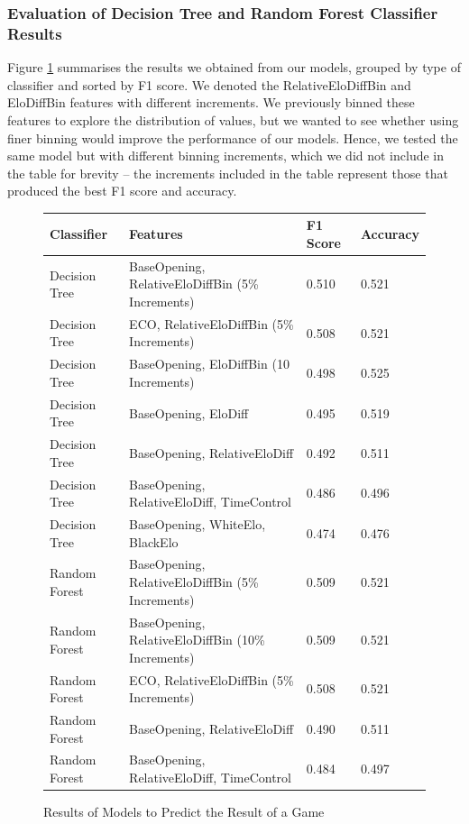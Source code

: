 \documentclass[a4paper, 11pt]{article}
\begin{document}
\subsubsection{Evaluation of Decision Tree and Random Forest Classifier Results}
Figure \ref{fig:resultsOfModelsToPredictResultOfAGame} summarises the results we obtained from our models, grouped by type of classifier and sorted by F1 score. We denoted the RelativeEloDiffBin and EloDiffBin features with different increments. We previously binned these features to explore the distribution of values, but we wanted to see whether using finer binning would improve the performance of our models. Hence, we tested the same model but with different binning increments, which we did not include in the table for brevity -- the increments included in the table represent those that produced the best F1 score and accuracy.

\begin{figure}[H]
    \centering
    \caption{Results of Models to Predict the Result of a Game}
    \label{fig:resultsOfModelsToPredictResultOfAGame}
    \begin{tabular}{| l | l | l | l |} 
        \hline
        \bf{Classifier} & \bf{Features} & \bf{F1 Score} & \bf{Accuracy} \\ [0.5ex] 
        \hline
        Decision Tree & BaseOpening, RelativeEloDiffBin (5\% Increments) & 0.510 & 0.521 \\
        \hline
        Decision Tree & ECO, RelativeEloDiffBin (5\% Increments) & 0.508 & 0.521 \\
        \hline
        Decision Tree & BaseOpening, EloDiffBin (10 Increments) & 0.498 & 0.525 \\
        \hline
        Decision Tree & BaseOpening, EloDiff & 0.495 & 0.519 \\
        \hline
        Decision Tree & BaseOpening, RelativeEloDiff & 0.492 & 0.511 \\
        \hline
        Decision Tree & BaseOpening, RelativeEloDiff, TimeControl & 0.486 & 0.496 \\
        \hline
        Decision Tree & BaseOpening, WhiteElo, BlackElo & 0.474 & 0.476 \\ 
        \hline
        Random Forest & BaseOpening, RelativeEloDiffBin (5\% Increments) & 0.509 & 0.521 \\ 
        \hline
        Random Forest & BaseOpening, RelativeEloDiffBin (10\% Increments) & 0.509 & 0.521 \\ 
        \hline
        Random Forest & ECO, RelativeEloDiffBin (5\% Increments) & 0.508 & 0.521 \\ 
        \hline
        Random Forest & BaseOpening, RelativeEloDiff & 0.490 & 0.511 \\ 
        \hline
        Random Forest & BaseOpening, RelativeEloDiff, TimeControl & 0.484 & 0.497 \\ 
        \hline
    \end{tabular}
\end{figure}
\end{document}
